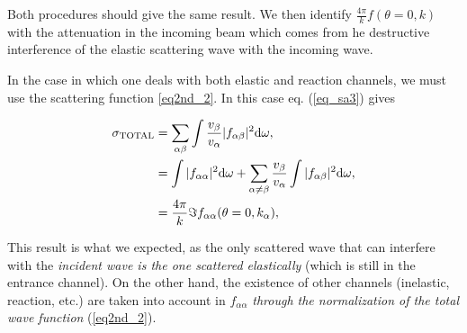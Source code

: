 Both procedures should give the same result. We then identify $\frac{4\pi}{k} f(\theta=0,k)$ with the attenuation in the incoming beam which comes from he destructive interference of the elastic scattering wave with the incoming wave.

In the case in which one deals with both elastic and reaction channels, we must use the scattering function \ref{eq2nd_2}. In this case eq. (\ref{eq_sa3}) gives

\begin{equation}
\begin{split}
\sigma_{\rm TOTAL} &= \sum_{\alpha \beta} \int \frac{v_{\beta}}{v_{\alpha}} |f_{\alpha \beta}|^2 {\rm d}\omega, \\
&= \int |f_{\alpha \alpha}|^2 {\rm d}\omega + \sum_{\alpha \neq \beta} \frac{v_{\beta}}{v_{\alpha}} \int |f_{\alpha \beta}|^2 {\rm d}\omega, \\
&= \frac{4\pi}{k} \Im f_{\alpha \alpha}(\theta=0, k_{\alpha}),
\end{split}
\end{equation}

This result is what we expected, as the only scattered wave that can interfere with the {\it incident wave is the one scattered elastically} (which is still in the entrance channel). On the other hand, the existence of other channels (inelastic, reaction, etc.) are taken into account in $f_{\alpha \alpha}$ {\it through the normalization of the total wave function} (\ref{eq2nd_2}).





